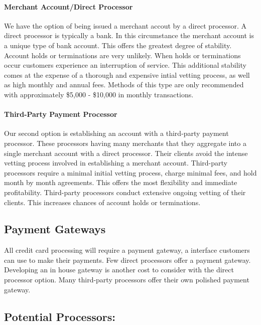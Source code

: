 \documentclass[letterpaper]{article}
\begin{document}
      \paragraph{Merchant Account/Direct Processor}
        We have the option of being issued a merchant accout by a direct processor. A direct processor
        is typically a bank. In this circumstance the merchant account is a unique type of bank account.
        This offers the greatest degree of stability. Account holds or terminations are very unlikely.
        When holds or terminations occur customers experience an interruption of service.
        This additional stability comes at the expense of a thorough and expensive intial vetting process, as well
        as high monthly and annual fees. Methods of this type are only recommended with approximately \$5,000 - \$10,000
        in monthly transactions.
      \paragraph{Third-Party Payment Processor}
        Our second option is establishing an account with a third-party payment processor. These processors having many
        merchants that they aggregate into a single merchant account with a direct processor. Their clients avoid
        the intense vetting process involved in establishing a merchant account. Third-party processors require a minimal initial vetting process,
        charge minimal fees, and hold month by month agreements. This offers the most flexibility and immediate profitability. Third-party processors conduct
        extensive ongoing vetting of their clients. This increases chances of account holds or terminations.
    \subsection{Payment Gateways}
        All credit card processing will require a payment gateway, a interface customers can use to make their payments.
        Few direct processors offer a payment gateway. Developing an in house gateway is another cost to consider with the direct processor option.
        Many third-party processors offer their own polished payment gateway.
    \subsection{Potential Processors:}
\end{document}
